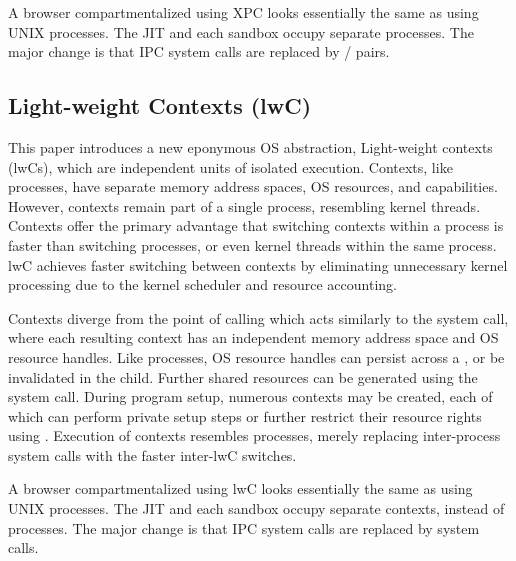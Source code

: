 A browser compartmentalized using XPC looks essentially the same as
using UNIX processes. 
The JIT and each sandbox occupy separate processes.
The major change is that IPC system calls are replaced by 
/ pairs.

\subsection{Light-weight Contexts (lwC)}
This paper introduces a new eponymous OS abstraction,
Light-weight contexts (lwCs),
which are independent units of isolated execution.
Contexts, like processes, have separate memory address spaces, OS resources,
and capabilities.
However, contexts remain part of a single process, resembling kernel threads.
Contexts offer the primary advantage that switching contexts within a process is 
faster than switching processes, or even kernel threads within the same process.
lwC achieves faster switching between contexts by eliminating unnecessary kernel
processing due to the kernel scheduler and resource accounting.

Contexts diverge from the point of calling  which acts similarly
to the  system call, where each resulting context has an 
independent memory address space and OS resource handles.
Like processes, OS resource handles can persist across a , or be
invalidated in the child.
Further shared resources can be generated using the  system 
call.
During program setup, numerous contexts may be created, each of which can
perform private setup steps or further restrict their resource rights using
.
Execution of contexts resembles processes, merely replacing inter-process system
calls with the faster inter-lwC switches.

A browser compartmentalized using lwC looks essentially the same as
using UNIX processes. 
The JIT and each sandbox occupy separate contexts, instead of processes.
The major change is that IPC system calls are replaced by 
system calls.

